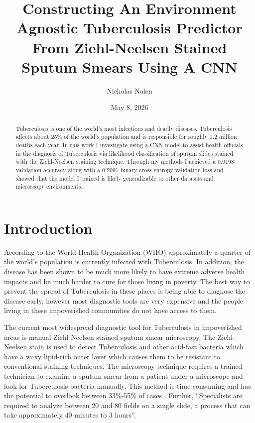 \documentclass{article}
\title{Constructing An Environment Agnostic Tuberculosis Predictor From Ziehl-Neelsen Stained Sputum Smears Using A CNN}
\author{Nicholas Nolen}
\date{May 8, 2026}
\begin{document}
\maketitle

\begin{abstract}

Tuberculosis is one of the world's most infectious and deadly diseases. Tuberculosis affects about 25\%
of the world's population and is responsible for roughly 1.2 million deaths each year. In this work
I investigate using a CNN model to assist health officials in the diagnosis of Tuberculosis via likelihood classification of sputum
slides stained with the Ziehl-Neelsen staining technique. Through my methods I achieved a 0.9198
validation accuracy along with a 0.2097 binary cross-entropy validation loss and showed that the model I trained is likely
generalizable to other datasets and microscopy environments.
\end{abstract}

\section{Introduction}

According to the World Health Organization (WHO) approximately a quarter of the world's population is 
currently infected with Tuberculosis\cite{bai2024global}. In addition, the disease has been shown to be much more likely to 
have extreme adverse health impacts and be much harder to cure for those living in poverty. The best way to
prevent the spread of Tuberculosis in these places is being able to diagnose the disease early, however most diagnostic tools are very
expensive and the people living in these impoverished communities do not have access to them.

The current most widespread diagnostic tool for Tuberculosis in impoverished areas is manual Ziehl Neelsen stained sputum smear microscopy. The
Ziehl-Neelsen stain is used to detect Tuberculosis and other acid-fast bacteria which have a waxy lipid-rich outer layer
which causes them to be resistant to conventional staining techniques.
The microscopy technique requires a trained technician to examine a sputum smear from a patient under a microscope
and look for Tuberculosis bacteria manually. This method is time-consuming and has the potential to overlook between 33\%-55\% of cases
\cite{10.1007/978-1-4471-1599-1_123}. Further, “Specialists are required to analyze between 20 and 80 fields on a single slide, 
a process that can take approximately 40 minutes to 3 hours”\cite{TAMURA2024200365}.
\end{document}
